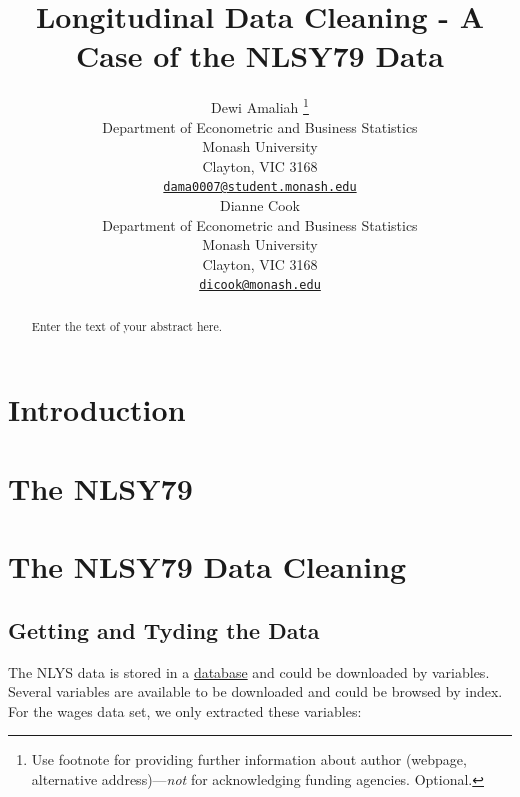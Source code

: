 \documentclass{article}
\title{Longitudinal Data Cleaning - A Case of the NLSY79 Data}
\author{
    Dewi Amaliah
    \thanks{Use footnote for providing further information about author (webpage,
alternative address)---\emph{not} for acknowledging funding agencies.
Optional.}
   \\
    Department of Econometric and Business Statistics \\
    Monash University \\
  Clayton, VIC 3168 \\
  \texttt{\href{mailto:dama0007@student.monash.edu}{\nolinkurl{dama0007@student.monash.edu}}} \\
   \And
    Dianne Cook
   \\
    Department of Econometric and Business Statistics \\
    Monash University \\
  Clayton, VIC 3168 \\
  \texttt{\href{mailto:dicook@monash.edu}{\nolinkurl{dicook@monash.edu}}} \\
  }
\begin{document}
\maketitle

\def\tightlist{}


\begin{abstract}
Enter the text of your abstract here.
\end{abstract}


\hypertarget{introduction}{%
\section{Introduction}\label{introduction}}

\hypertarget{the-nlsy79}{%
\section{The NLSY79}\label{the-nlsy79}}

\hypertarget{the-nlsy79-data-cleaning}{%
\section{The NLSY79 Data Cleaning}\label{the-nlsy79-data-cleaning}}

\hypertarget{getting-and-tyding-the-data}{%
\subsection{Getting and Tyding the
Data}\label{getting-and-tyding-the-data}}

The NLYS data is stored in a
\href{https://www.nlsinfo.org/content/cohorts/nlsy79/get-data}{database}
and could be downloaded by variables. Several variables are available to
be downloaded and could be browsed by index. For the wages data set, we
only extracted these variables:
\end{document}
